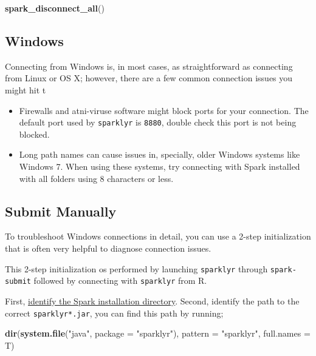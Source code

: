 \documentclass[]{book}
\newenvironment{Shaded}{\begin{snugshade}}{\end{snugshade}}
\newcommand{\DataTypeTok}[1]{\textcolor[rgb]{0.13,0.29,0.53}{#1}}
\newcommand{\KeywordTok}[1]{\textcolor[rgb]{0.13,0.29,0.53}{\textbf{#1}}}
\newcommand{\NormalTok}[1]{#1}
\newcommand{\StringTok}[1]{\textcolor[rgb]{0.31,0.60,0.02}{#1}}
\providecommand{\tightlist}{%
  \setlength{\itemsep}{0pt}\setlength{\parskip}{0pt}}
\theoremstyle{definition}
\theoremstyle{definition}
\theoremstyle{definition}
\theoremstyle{remark}
\begin{document}
\begin{Shaded}
\begin{Highlighting}[]
\KeywordTok{spark_disconnect_all}\NormalTok{()}
\end{Highlighting}
\end{Shaded}

\hypertarget{windows}{%
\subsection{Windows}\label{windows}}

Connecting from Windows is, in most cases, as straightforward as
connecting from Linux or OS X; however, there are a few common
connection issues you might hit t

\begin{itemize}
\tightlist
\item
  Firewalls and atni-viruse software might block ports for your
  connection. The default port used by \texttt{sparklyr} is
  \texttt{8880}, double check this port is not being blocked.
\item
  Long path names can cause issues in, specially, older Windows systems
  like Windows 7. When using these systems, try connecting with Spark
  installed with all folders using 8 characters or less.
\end{itemize}

\hypertarget{submit-manually}{%
\subsection{Submit Manually}\label{submit-manually}}

To troubleshoot Windows connections in detail, you can use a 2-step
initialization that is often very helpful to diagnose connection issues.

This 2-step initialization os performed by launching \texttt{sparklyr}
through \texttt{spark-submit} followed by connecting with
\texttt{sparklyr} from R.

First, \href{troubleshoot-spark-submit}{identify the Spark installation
directory}. Second, identify the path to the correct
\texttt{sparklyr*.jar}, you can find this path by running;

\begin{Shaded}
\begin{Highlighting}[]
\KeywordTok{dir}\NormalTok{(}\KeywordTok{system.file}\NormalTok{(}\StringTok{"java"}\NormalTok{, }\DataTypeTok{package =} \StringTok{"sparklyr"}\NormalTok{), }\DataTypeTok{pattern =} \StringTok{"sparklyr"}\NormalTok{, }\DataTypeTok{full.names =}\NormalTok{ T)}
\end{Highlighting}
\end{Shaded}
\end{document}
